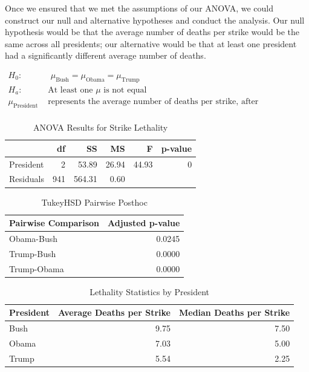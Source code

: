 \documentclass[
]{article}
\begin{document}
Once we ensured that we met the assumptions of our ANOVA, we could
construct our null and alternative hypotheses and conduct the analysis.
Our null hypothesis would be that the average number of deaths per
strike would be the same across all presidents; our alternative would be
that at least one president had a significantly different average number
of deaths.

\[
\begin{aligned}
H_0: & \text{ } \mu_\text{Bush} = \mu_\text{Obama} = \mu_\text{Trump} \\
H_a: & \text{ At least one } \mu \text{ is not equal} \\
\mu_\text{President} & \text{ represents the average number of deaths per strike, after transformation} \\
\end{aligned}
\]

\begin{table}[H]

\caption{\label{tab:drone_leth}ANOVA Results for Strike Lethality}
\centering
\begin{tabular}[t]{lrrrrr}
\toprule
  & df & SS & MS & F & p-value\\
\midrule
President & 2 & 53.89 & 26.94 & 44.93 & 0\\
Residuals & 941 & 564.31 & 0.60 &  & \\
\bottomrule
\end{tabular}
\end{table}

\begin{table}[H]

\caption{\label{tab:drone_leth_posthoc}TukeyHSD Pairwise Posthoc}
\centering
\begin{tabular}[t]{lr}
\toprule
Pairwise Comparison & Adjusted p-value\\
\midrule
Obama-Bush & 0.0245\\
Trump-Bush & 0.0000\\
Trump-Obama & 0.0000\\
\bottomrule
\end{tabular}
\end{table}
\begin{table}[H]

\caption{\label{tab:drone_leth_posthoc2}Lethality Statistics by President}
\centering
\begin{tabular}[t]{lrr}
\toprule
President & Average Deaths per Strike & Median Deaths per Strike\\
\midrule
Bush & 9.75 & 7.50\\
Obama & 7.03 & 5.00\\
Trump & 5.54 & 2.25\\
\bottomrule
\end{tabular}
\end{table}
\end{document}
